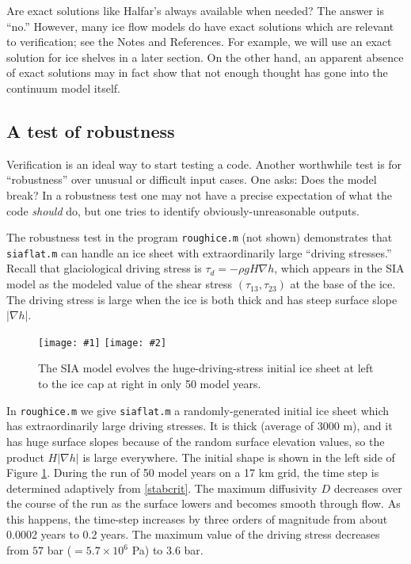 \documentclass[letterpaper,final,12pt,reqno]{amsart}
\newcommand{\grad}{\nabla}
\newcommand{\twofigsizes}[5]{
\begin{figure}[ht]
\centering
\texttt{[image: \#1]} \quad
\texttt{[image: \#2]}
\caption{#3}
\label{fig:#1}
\end{figure}}
\begin{document}
Are exact solutions like Halfar's always available when needed?  The answer is ``no.''  However, many ice flow models do have exact solutions which are relevant to verification; see the Notes and References.  For example, we will use an exact solution for ice shelves in a later section.  On the other hand, an apparent absence of exact solutions may in fact show that not enough thought has gone into the continuum model itself.

\subsection*{A test of robustness}  Verification is an ideal way to start testing a code.  Another worthwhile test is for ``robustness'' over unusual or difficult input cases.  One asks: Does the model break?  In a robustness test one may not have a precise expectation of what the code \emph{should} do, but one tries to identify obviously-unreasonable outputs.

The robustness test in the program \texttt{roughice.m} (not shown) demonstrates that \texttt{siaflat.m} can handle an ice sheet with extraordinarily large ``driving stresses.''  Recall that glaciological driving stress is $\tau_d = - \rho g H \grad h$, which appears in the SIA model as the modeled value of the shear stress $(\tau_{13},\tau_{23})$ at the base of the ice.  The driving stress is large when the ice is both thick and has steep surface slope $|\nabla h|$.

\twofigsizes{roughinitial}{roughfinal}{The SIA model evolves the huge-driving-stress initial ice sheet at left to the ice cap at right in only 50 model years.}{2.9in}{2.9in}

In \texttt{roughice.m} we give \texttt{siaflat.m} a randomly-generated initial ice sheet which has extraordinarily large driving stresses.  It is thick (average of 3000 m), and it has huge surface slopes because of the random surface elevation values, so the product $H|\grad h|$ is large everywhere.  The initial shape is shown in the left side of Figure \ref{fig:roughinitial}.  During the run of 50 model years on a 17 km grid, the time step is determined adaptively from \eqref{stabcrit}.  The maximum diffusivity $D$ decreases over the course of the run as the surface lowers and becomes smooth through flow.  As this happens, the time-step increases by three orders of magnitude from about 0.0002 years to 0.2 years.  The maximum value of the driving stress decreases from $57$ bar ($= 5.7\times 10^6$ Pa) to $3.6$ bar.
\end{document}
